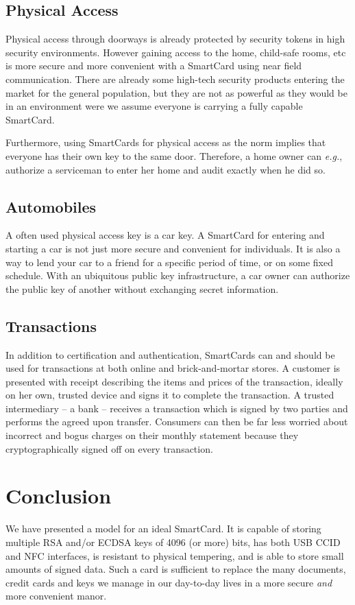 \documentclass[11pt, twocolumn]{article}
\begin{document}
\subsection{Physical Access}

Physical access through doorways is already protected by security tokens in high
security environments. However gaining access to the home, child-safe rooms, etc
is more secure and more convenient with a SmartCard using near field
communication. There are already some high-tech security products entering the
market for the general population, but they are not as powerful as they would be
in an environment were we assume everyone is carrying a fully capable SmartCard.

Furthermore, using SmartCards for physical access as the norm implies that
everyone has their own key to the same door. Therefore, a home owner can
\textit{e.g.}, authorize a serviceman to enter her home and audit exactly when
he did so.

\subsection{Automobiles}

A often used physical access key is a car key. A SmartCard for entering and
starting a car is not just more secure and convenient for individuals. It is
also a way to lend your car to a friend for a specific period of time, or on
some fixed schedule. With an ubiquitous public key infrastructure, a car owner
can authorize the public key of another without exchanging secret information.

\subsection{Transactions}

In addition to certification and authentication, SmartCards can and should be
used for transactions at both online and brick-and-mortar stores. A customer is
presented with receipt describing the items and prices of the transaction,
ideally on her own, trusted device and signs it to complete the transaction. A
trusted intermediary -- a bank -- receives a transaction which is signed by two
parties and performs the agreed upon transfer. Consumers can then be far less
worried about incorrect and bogus charges on their monthly statement because
they cryptographically signed off on every transaction.

\section{Conclusion}
\label{sec:conclusion}

We have presented a model for an ideal SmartCard. It is capable of storing
multiple RSA and/or ECDSA keys of 4096 (or more) bits, has both USB CCID and
NFC interfaces, is resistant to physical tempering, and is able to store small
amounts of signed data. Such a card is sufficient to replace the many documents,
credit cards and keys we manage in our day-to-day lives in a more secure
\textit{and} more convenient manor.



\end{document}
